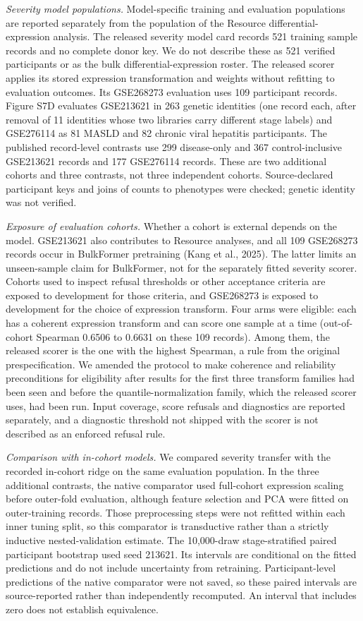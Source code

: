 \emph{Severity model populations.} Model-specific training and evaluation populations are reported separately from the population of the Resource differential-expression analysis. The released severity model card records 521 training sample records and no complete donor key. We do not describe these as 521 verified participants or as the bulk differential-expression roster. The released scorer applies its stored expression transformation and weights without refitting to evaluation outcomes. Its GSE268273 evaluation uses 109 participant records. Figure S7D evaluates GSE213621 in 263 genetic identities (one record each, after removal of 11 identities whose two libraries carry different stage labels) and GSE276114 as 81 MASLD and 82 chronic viral hepatitis participants. The published record-level contrasts use 299 disease-only and 367 control-inclusive GSE213621 records and 177 GSE276114 records. These are two additional cohorts and three contrasts, not three independent cohorts. Source-declared participant keys and joins of counts to phenotypes were checked; genetic identity was not verified.

\emph{Exposure of evaluation cohorts.} Whether a cohort is external depends on the model. GSE213621 also contributes to Resource analyses, and all 109 GSE268273 records occur in BulkFormer pretraining (Kang et al., 2025). The latter limits an unseen-sample claim for BulkFormer, not for the separately fitted severity scorer. Cohorts used to inspect refusal thresholds or other acceptance criteria are exposed to development for those criteria, and GSE268273 is exposed to development for the choice of expression transform. Four arms were eligible: each has a coherent expression transform and can score one sample at a time (out-of-cohort Spearman 0.6506 to 0.6631 on these 109 records). Among them, the released scorer is the one with the highest Spearman, a rule from the original prespecification. We amended the protocol to make coherence and reliability preconditions for eligibility after results for the first three transform families had been seen and before the quantile-normalization family, which the released scorer uses, had been run. Input coverage, score refusals and diagnostics are reported separately, and a diagnostic threshold not shipped with the scorer is not described as an enforced refusal rule.

\emph{Comparison with in-cohort models.} We compared severity transfer with the recorded in-cohort ridge on the same evaluation population. In the three additional contrasts, the native comparator used full-cohort expression scaling before outer-fold evaluation, although feature selection and PCA were fitted on outer-training records. Those preprocessing steps were not refitted within each inner tuning split, so this comparator is transductive rather than a strictly inductive nested-validation estimate. The 10,000-draw stage-stratified paired participant bootstrap used seed 213621. Its intervals are conditional on the fitted predictions and do not include uncertainty from retraining. Participant-level predictions of the native comparator were not saved, so these paired intervals are source-reported rather than independently recomputed. An interval that includes zero does not establish equivalence.

